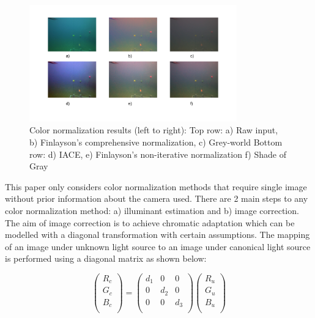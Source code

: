 \documentclass[hyp]{socreport}
\begin{document}
\begin{figure}[H]
\centering
  \includegraphics[width=0.8\textwidth, height=0.3\textheight]{color_constancy.png}
  \caption{Color normalization results (left to right): \newline Top row:
  a) Raw input, b) Finlayson's comprehensive normalization, c) Grey-world \newline Bottom
  row: d) IACE, e) Finlayson's non-iterative normalization f) Shade of Gray}
  \label{fig:colorconstancy_results}
\end{figure}

This paper only considers color normalization methods that require single image
without prior information about the camera used. There are 2 main steps to any
color normalization method: a) illuminant estimation and b) image correction.
The aim of image correction is to achieve chromatic adaptation which can be
modelled with a diagonal transformation  with certain assumptions.
The mapping of an image under unknown light source to an image under canonical
light source is performed using a diagonal matrix as shown below:

\[
\begin{pmatrix}
  R_c \\
  G_c \\
  B_c \\
\end{pmatrix}
=
\begin{pmatrix}
  d_1 & 0 & 0 \\
  0 & d_2 & 0 \\
  0 & 0 & d_3\\
\end{pmatrix}
\begin{pmatrix}
  R_u \\
  G_u \\
  B_u \\
\end{pmatrix}
\]
\end{document}
